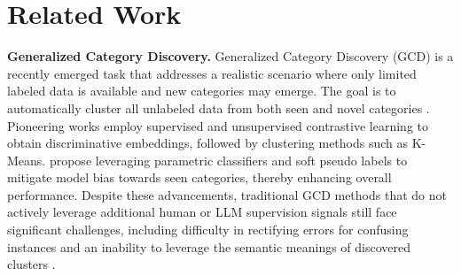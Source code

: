 \section{Related Work}

\noindent \textbf{Generalized Category Discovery. }
Generalized Category Discovery (GCD) \cite{vaze2022generalized, wen2023simgcd, an-etal-2024-generalized, liang-etal-2024-actively} is a recently emerged task that addresses a realistic scenario where only limited labeled data is available and new categories may emerge. The goal is to automatically cluster all unlabeled data from both seen and novel categories \cite{bai2023towards, zou-etal-2023-decrisismb}. Pioneering works \cite{vaze2022generalized, pu2023dynamic} employ supervised and unsupervised contrastive learning to obtain discriminative embeddings, followed by clustering methods such as K-Means. \citet{wen2023simgcd, bai2023towards} propose leveraging parametric classifiers and soft pseudo labels to mitigate model bias towards seen categories, thereby enhancing overall performance. Despite these advancements, traditional GCD methods that do not actively leverage additional human or LLM supervision signals \cite{zhang2021discovering, zhang-etal-2022-new, zhou-etal-2023-probabilistic, zhang2023clustering, liang-liao-2023-clusterprompt, Raedt2023IDASID, sung-etal-2023-pre} still face significant challenges, including difficulty in rectifying errors for confusing instances and an inability to leverage the semantic meanings of discovered clusters \cite{ma2024active, an-etal-2024-generalized}. \\


